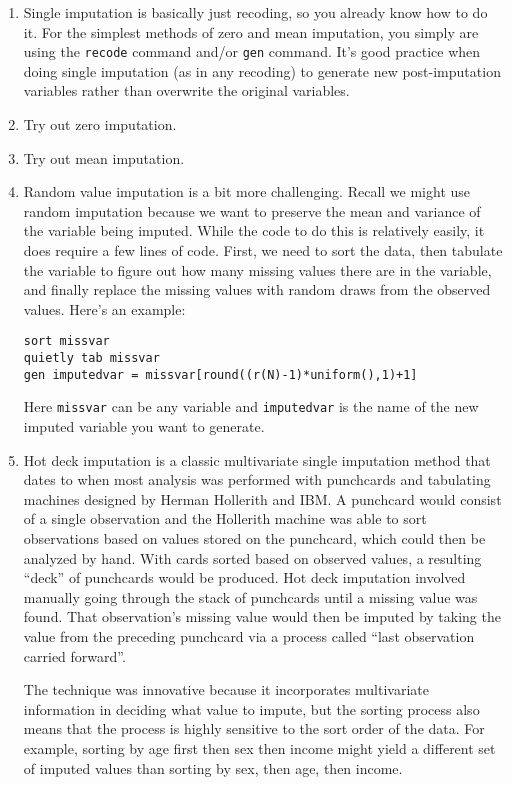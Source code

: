\documentclass[a4paper,12pt]{article}
\begin{document}
\begin{enumerate}
\item Single imputation is basically just recoding, so you already know how to do it. For the simplest methods of zero and mean imputation, you simply are using the \texttt{recode} command and/or \texttt{gen} command. It's good practice when doing single imputation (as in any recoding) to generate new post-imputation variables rather than overwrite the original variables.
\item Try out zero imputation. %
\item Try out mean imputation. %
\item Random value imputation is a bit more challenging. Recall we might use random imputation because we want to preserve the mean and variance of the variable being imputed. While the code to do this is relatively easily, it does require a few lines of code. First, we need to sort the data, then tabulate the variable to figure out how many missing values there are in the variable, and finally replace the missing values with random draws from the observed values. Here's an example:
\begin{verbatim}
sort missvar
quietly tab missvar
gen imputedvar = missvar[round((r(N)-1)*uniform(),1)+1]
\end{verbatim}

Here \texttt{missvar} can be any variable and \texttt{imputedvar} is the name of the new imputed variable you want to generate.

\item Hot deck imputation is a classic multivariate single imputation method that dates to when most analysis was performed with punchcards and tabulating machines designed by Herman Hollerith and IBM. A punchcard would consist of a single observation and the Hollerith machine was able to sort observations based on values stored on the punchcard, which could then be analyzed by hand. With cards sorted based on observed values, a resulting ``deck'' of punchcards would be produced. Hot deck imputation involved manually going through the stack of punchcards until a missing value was found. That observation's missing value would then be imputed by taking the value from the preceding punchcard via a process called ``last observation carried forward''.

The technique was innovative because it incorporates multivariate information in deciding what value to impute, but the sorting process also means that the process is highly sensitive to the sort order of the data. For example, sorting by age first then sex then income might yield a different set of imputed values than sorting by sex, then age, then income.


\end{enumerate}
\end{document}
